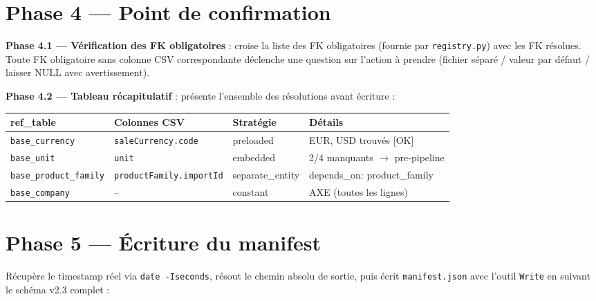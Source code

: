 \section*{Phase 4 — Point de confirmation}

\textbf{Phase 4.1 — Vérification des FK obligatoires} : croise la liste des FK
obligatoires (fournie par \texttt{registry.py}) avec les FK résolues. Toute FK
obligatoire sans colonne CSV correspondante déclenche une question sur l'action à prendre
(fichier séparé / valeur par défaut / laisser NULL avec avertissement).

\medskip
\textbf{Phase 4.2 — Tableau récapitulatif} : présente l'ensemble des résolutions avant
écriture :

\begin{center}
\renewcommand{\arraystretch}{1.35}
{\small
\begin{tabular}{|p{3.3cm}|p{3.2cm}|p{2.7cm}|p{4.0cm}|}
  \hline
  \textbf{ref\_table} & \textbf{Colonnes CSV} & \textbf{Stratégie} & \textbf{Détails} \\
  \hline
  \texttt{base\_currency}        & \texttt{saleCurrency.}\newline\texttt{code}     & preloaded       & EUR, USD trouvés [OK] \\
  \hline
  \texttt{base\_unit}            & \texttt{unit}                  & embedded        & 2/4 manquants $\to$ pre-pipeline \\
  \hline
  \texttt{base\_product\_}\newline\texttt{family} & \texttt{productFamily.}\newline\texttt{importId}& separate\_entity& depends\_on: product\_family \\
  \hline
  \texttt{base\_company}         & --                             & constant        & AXE (toutes les lignes) \\
  \hline
\end{tabular}}
\end{center}

\section*{Phase 5 — Écriture du manifest}

Récupère le timestamp réel via \texttt{date -Iseconds}, résout le chemin absolu de
sortie, puis écrit \texttt{manifest.json} avec l'outil \texttt{Write} en suivant
le schéma v2.3 complet :

